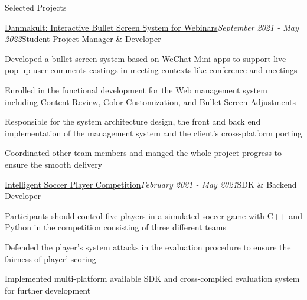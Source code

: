 \documentclass{resume} %
\newcommand{\Feb}{February }
\newcommand{\May}{May }
\newcommand{\Sept}{September }
\begin{document}


    
\begin{rSection}{Selected Projects}
  
\begin{rSubsection}{\href{https://github.com/panda2134/DanmakuIt}{Danmakult: Interactive Bullet Screen System for Webinars}}{\em \Sept 2021 - \May 2022}{Student Project Manager \& Developer}{}
    
\item Developed a bullet screen system based on WeChat Mini-apps to support live pop-up user comments castings in meeting contexts like conference and meetings
\item Enrolled in the functional development for the Web management system including Content Review, Color Customization, and Bullet Screen Adjustments
\item Responsible for the system architecture design, the front and back end implementation of the management system and the client's cross-platform porting
\item Coordinated other team members and manged the whole project progress to ensure the smooth delivery

\end{rSubsection}

\begin{rSubsection}{\href{https://github.com/ssast-tech/thuai-egg-2021-backend}{Intelligent Soccer Player Competition}}{\em \Feb 2021 - \May 2021}{SDK \& Backend Developer}{}
    
\item Participants should control five players in a simulated soccer game with C++ and Python in the competition consisting of three different teams
\item Defended the player's system attacks in the evaluation procedure to ensure the fairness of player' scoring
\item Implemented multi-platform available SDK and cross-complied evaluation system for further development


\end{rSubsection}

\end{rSection}
\end{document}
